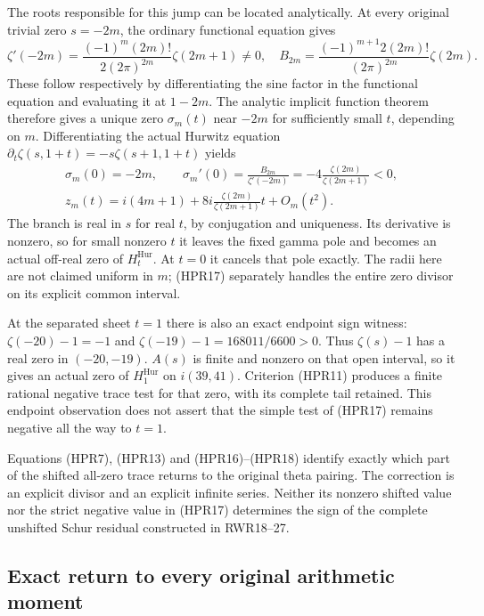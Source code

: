 The roots responsible for this jump can be located analytically.
At every original trivial zero $s=-2m$, the ordinary functional equation
gives
\[
 \zeta'(-2m)=\frac{(-1)^m(2m)!}{2(2\pi)^{2m}}\zeta(2m+1)\ne0,
 \quad
 B_{2m}=\frac{(-1)^{m+1}2(2m)!}{(2\pi)^{2m}}\zeta(2m).
\]
These follow respectively by differentiating the sine factor in the
functional equation and evaluating it at $1-2m$.
The analytic implicit function theorem therefore gives a unique
zero $\sigma_m(t)$ near $-2m$ for sufficiently small $t$, depending
on $m$. Differentiating the actual Hurwitz equation
$\partial_t\zeta(s,1+t)=-s\zeta(s+1,1+t)$ yields
\begin{equation}\tag{HPR18}
 \begin{gathered}
 \sigma_m(0)=-2m,\qquad
 \sigma_m'(0)=\frac{B_{2m}}{\zeta'(-2m)}
       =-4\frac{\zeta(2m)}{\zeta(2m+1)}<0,\\
 z_m(t)=i(4m+1)+8i\frac{\zeta(2m)}{\zeta(2m+1)}t+O_m(t^2).
 \end{gathered}
\end{equation}
The branch is real in $s$ for real $t$, by conjugation and uniqueness.
Its derivative is nonzero, so for small nonzero $t$ it leaves the
fixed gamma pole and becomes an actual off-real zero of $H_t^{\mathrm{Hur}}$.
At $t=0$ it cancels that pole exactly. The radii here are not claimed
uniform in $m$; (HPR17) separately handles the entire zero divisor
on its explicit common interval.

At the separated sheet $t=1$ there is also an exact endpoint sign
witness: $\zeta(-20)-1=-1$ and
$\zeta(-19)-1=168011/6600>0$. Thus $\zeta(s)-1$ has a real zero
in $(-20,-19)$. $A(s)$ is finite and nonzero on that open interval,
so it gives an actual zero of $H_1^{\mathrm{Hur}}$ on $i(39,41)$.
Criterion (HPR11) produces a finite rational negative trace test for
that zero, with its complete tail retained. This endpoint observation
does not assert that the simple test of (HPR17) remains negative all
the way to $t=1$.

Equations (HPR7), (HPR13) and (HPR16)--(HPR18) identify exactly which
part of the shifted all-zero trace returns to the original theta
pairing. The correction is an explicit divisor and an explicit
infinite series. Neither its nonzero shifted value nor the strict
negative value in (HPR17) determines the sign of the complete
unshifted Schur residual constructed in RWR18--27.

\subsection{Exact return to every original arithmetic moment}

